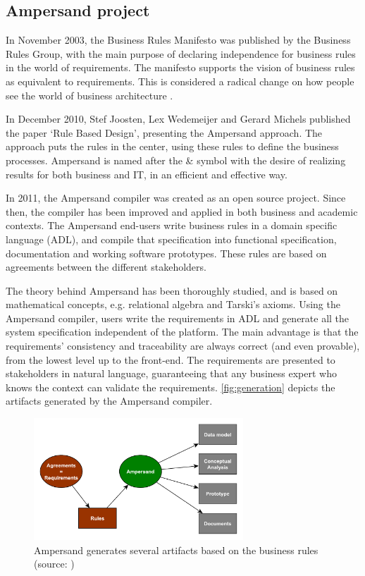 
\subsection{Ampersand project}
In November 2003, the Business Rules Manifesto  was published by the Business Rules Group, with the main purpose of declaring independence for business rules in the world of requirements.
The manifesto supports the vision of business rules as equivalent to requirements.
This is considered a radical change on how people see the world of business architecture . 

In December 2010, Stef Joosten, Lex Wedemeijer and Gerard Michels published the paper `Rule Based Design', presenting the Ampersand approach.
The approach puts the rules in the center, using these rules to define the business processes.
Ampersand is named after the \& symbol with the desire of realizing results for both business and IT, in an efficient and effective way.

In 2011, the Ampersand compiler was created as an open source project.
Since then, the compiler has been improved and applied in both business and academic contexts.
The Ampersand end-users write business rules in a domain specific language (ADL), and compile that specification into functional specification, documentation and working software prototypes.
%
These rules are based on agreements between the different stakeholders.

The theory behind Ampersand has been thoroughly studied, and is based on mathe\-matical concepts, e.g. relational algebra and Tarski's axioms.
Using the Ampersand compiler, users write the requirements in ADL and generate all the system specification independent of the platform.
The main advantage is that the requirements' consistency and traceability are always correct (and even provable), from the lowest level up to the front-end.
The requirements are presented to stakeholders in natural language, guaranteeing that any business expert who knows the context can validate the requirements.
\autoref{fig:generation} depicts the artifacts generated by the Ampersand compiler.
%
\begin{figure}[htb]
	\centering
	\includegraphics[width=0.7\textwidth]{Figures/Generation}
	\caption[Generated artifacts]{Ampersand generates several artifacts based on the business rules (source: \cite{ampersand-approach})}
	\label{fig:generation}
\end{figure}
%

